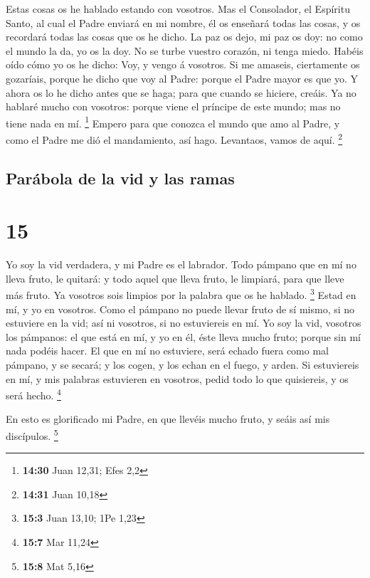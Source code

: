  Estas cosas os he hablado estando con vosotros.
 Mas el Consolador, el Espíritu Santo, al cual el Padre
enviará en mi nombre, él os enseñará todas las cosas, y os recordará
todas las cosas que os he dicho.  La paz os dejo, mi paz os
doy: no como el mundo la da, yo os la doy. No se turbe vuestro corazón,
ni tenga miedo.  Habéis oído cómo yo os he dicho: Voy, y
vengo á vosotros. Si me amaseis, ciertamente os gozaríais, porque he
dicho que voy al Padre: porque el Padre mayor es que yo.  Y
ahora os lo he dicho antes que se haga; para que cuando se hiciere,
creáis.  Ya no hablaré mucho con vosotros: porque viene el
príncipe de este mundo; mas no tiene nada en mí. \footnote{\textbf{14:30}
  Juan 12,31; Efes 2,2}  Empero para que conozca el mundo
que amo al Padre, y como el Padre me dió el mandamiento, así hago.
Levantaos, vamos de aquí. \footnote{\textbf{14:31} Juan 10,18}

\hypertarget{paruxe1bola-de-la-vid-y-las-ramas}{%
\subsection{Parábola de la vid y las
ramas}\label{paruxe1bola-de-la-vid-y-las-ramas}}

\hypertarget{section-14}{%
\section{15}\label{section-14}}

 Yo soy la vid verdadera, y mi Padre es el labrador.
 Todo pámpano que en mí no lleva fruto, le quitará: y todo
aquel que lleva fruto, le limpiará, para que lleve más fruto.
 Ya vosotros sois limpios por la palabra que os he hablado.
\footnote{\textbf{15:3} Juan 13,10; 1Pe 1,23}  Estad en mí,
y yo en vosotros. Como el pámpano no puede llevar fruto de sí mismo, si
no estuviere en la vid; así ni vosotros, si no estuviereis en mí.
 Yo soy la vid, vosotros los pámpanos: el que está en mí, y
yo en él, éste lleva mucho fruto; porque sin mí nada podéis hacer.
 El que en mí no estuviere, será echado fuera como mal
pámpano, y se secará; y los cogen, y los echan en el fuego, y arden.
 Si estuviereis en mí, y mis palabras estuvieren en
vosotros, pedid todo lo que quisiereis, y os será hecho. \footnote{\textbf{15:7}
  Mar 11,24}

 En esto es glorificado mi Padre, en que llevéis mucho
fruto, y seáis así mis discípulos. \footnote{\textbf{15:8} Mat 5,16}

